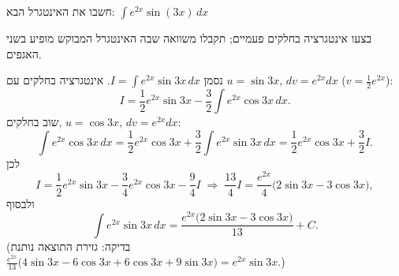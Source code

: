 
\begin{question}
חשבו את האינטגרל הבא:
$\displaystyle\int e^{2x}\sin(3x)\,dx$
\end{question}

\begin{hint}
בצעו אינטגרציה בחלקים פעמיים; תקבלו משוואה שבה האינטגרל המבוקש מופיע בשני האגפים.
\end{hint}

\begin{solution}
נסמן $I=\int e^{2x}\sin3x\,dx$. אינטגרציה בחלקים עם $u=\sin3x$, $dv=e^{2x}dx$ ($v=\frac12e^{2x}$):
\[ I=\frac12e^{2x}\sin3x-\frac32\int e^{2x}\cos3x\,dx. \]
שוב בחלקים, $u=\cos3x$, $dv=e^{2x}dx$:
\[ \int e^{2x}\cos3x\,dx=\frac12e^{2x}\cos3x+\frac32\int e^{2x}\sin3x\,dx=\frac12e^{2x}\cos3x+\frac32I. \]
לכן
\[ I=\frac12e^{2x}\sin3x-\frac34e^{2x}\cos3x-\frac94I\;\Longrightarrow\;\frac{13}{4}I=\frac{e^{2x}}{4}\big(2\sin3x-3\cos3x\big), \]
ולבסוף
\[ \int e^{2x}\sin3x\,dx=\frac{e^{2x}\big(2\sin3x-3\cos3x\big)}{13}+C. \]
(בדיקה: גזירת התוצאה נותנת $\frac{e^{2x}}{13}\big(4\sin3x-6\cos3x+6\cos3x+9\sin3x\big)=e^{2x}\sin3x$.)
\end{solution}
